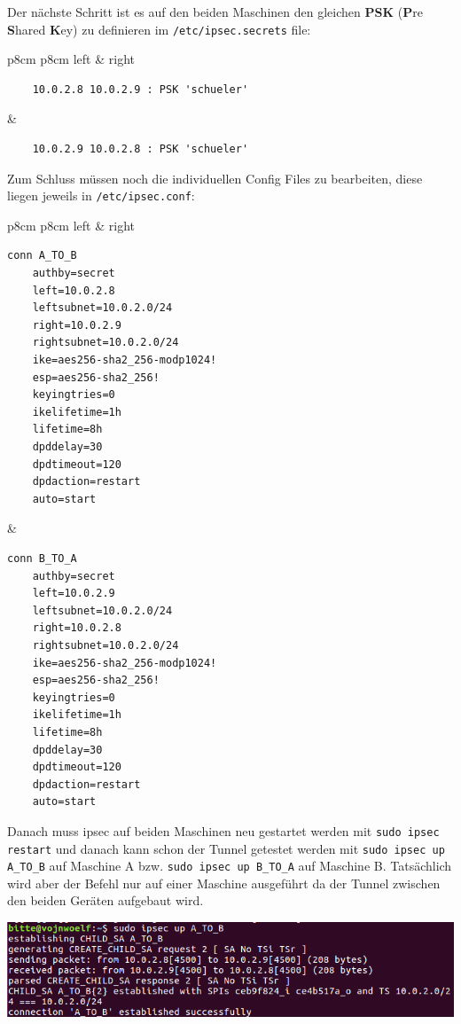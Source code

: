 Der nächste Schritt ist es auf den beiden Maschinen den gleichen \textbf{PSK} (\textbf{P}re \textbf{S}hared \textbf{K}ey) zu definieren im \verb|/etc/ipsec.secrets| file:


\begin{tabular}{p{8cm} p{8cm}}
	left  &   right\\
	\begin{lstlisting}
	10.0.2.8 10.0.2.9 : PSK 'schueler'
	\end{lstlisting}&
	\begin{lstlisting}
	10.0.2.9 10.0.2.8 : PSK 'schueler'
	\end{lstlisting}
\end{tabular} 




Zum Schluss müssen noch die individuellen Config Files zu bearbeiten, diese liegen jeweils in \verb|/etc/ipsec.conf|:

\begin{tabular}{p{8cm} p{8cm}}
	left  &   right\\
	\begin{lstlisting}
conn A_TO_B
	authby=secret
	left=10.0.2.8
	leftsubnet=10.0.2.0/24
	right=10.0.2.9
	rightsubnet=10.0.2.0/24
	ike=aes256-sha2_256-modp1024!
	esp=aes256-sha2_256!
	keyingtries=0
	ikelifetime=1h
	lifetime=8h
	dpddelay=30
	dpdtimeout=120
	dpdaction=restart
	auto=start
	\end{lstlisting}&
	\begin{lstlisting}
conn B_TO_A
	authby=secret
	left=10.0.2.9
	leftsubnet=10.0.2.0/24
	right=10.0.2.8
	rightsubnet=10.0.2.0/24
	ike=aes256-sha2_256-modp1024!
	esp=aes256-sha2_256!
	keyingtries=0
	ikelifetime=1h
	lifetime=8h
	dpddelay=30
	dpdtimeout=120
	dpdaction=restart
	auto=start
	\end{lstlisting}
\end{tabular} 

Danach muss ipsec auf beiden Maschinen neu gestartet werden mit \verb|sudo ipsec restart| und danach kann schon der Tunnel getestet werden mit \verb|sudo ipsec up A_TO_B| auf Maschine A bzw. \verb|sudo ipsec up B_TO_A| auf Maschine B. Tatsächlich wird aber der Befehl nur auf einer Maschine ausgeführt da der Tunnel zwischen den beiden Geräten aufgebaut wird.

\begin{minipage}{\linewidth}
	\centering
	\includegraphics[width=0.8\linewidth]{images/left}
\end{minipage}


